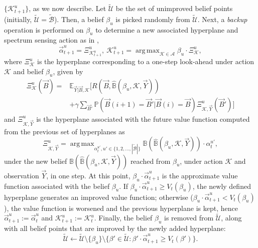 \documentclass[10pt,twocolumn]{IEEEtran}
\DeclareMathOperator*{\argmax}{arg\,max}
\begin{document}
$\{\mathcal K_{t+1}^{u}\}$, as we now describe. Let $\tilde{\mathcal{U}}$ be the set of unimproved belief points (initially, $\tilde{\mathcal{U}}{=}\tilde{\mathcal{B}}$). Then, a belief $\beta_u$ is picked randomly from $\tilde{\mathcal{U}}$. Next, a \emph{backup} operation is performed on $\beta_u$ to determine a new associated hyperplane and spectrum sensing action as in \cite{DBLP:journals/corr/abs-1109-2145},
\begin{equation}\label{20}
    \vec{\alpha}_{t+1}^{u}=\Xi_{\mathcal K_{t+1}^{u}}^{u},\ 
    \mathcal K_{t+1}^{u}=\argmax_{\mathcal{K} \in \mathcal{A}} \beta_u \cdot \Xi_{\mathcal{K}}^{u},
\end{equation}
where $\Xi_{\mathcal{K}}^{u}$ is the hyperplane corresponding to a one-step look-ahead under action $\mathcal K$ and belief $\beta_u$, given by
\begin{align*}
\Xi_{\mathcal{K}}^{u}(\vec{B}) = &\mathbb{E}_{\vec{Y}|\vec{B}, \mathcal{K}} \Big[R(\vec{B}, \hat{\mathbb{B}}(\beta_{u}, \mathcal{K}, \vec{Y}))\\
&+\gamma 
        \sum_{\vec{B}'}\mathbb{P}(\vec{B}(i+1){=} \vec{B}'|\vec{B}(i){=}\vec{B})
                \Xi_{\mathcal{K}, \vec{Y}}^{u}(\vec{B}')\Big]
\nonumber
\end{align*}
and $\Xi_{\mathcal{K}, \vec{Y}}^{u}$ is the hyperplane associated with the future value function computed from the previous set of hyperplanes as
\begin{equation}
    \Xi_{\mathcal{K}, \vec{Y}}^{u}=\argmax_{\alpha_{t}^{u'}, u' {\in} \{1, 2, \dots, |\tilde{\mathcal{B}}|\}} \mathbb{B}(\hat{\mathbb{B}}(\beta_{u}, \mathcal{K}, \vec{Y}))\cdot\alpha_{t}^{u'},
\nonumber
\end{equation}
under the new belief $\mathbb{B}(\hat{\mathbb{B}}(\beta_{u}, \mathcal{K}, \vec{Y}))$ reached from $\beta_{u}$, under action $\mathcal{K}$ and observation $\vec{Y}$, in one step. At this point, $\beta_{u}{\cdot}\vec{\alpha}_{t+1}^{u}$ is the approximate value function associated with the belief $\beta_u$. If $\beta_{u}{\cdot}\vec{\alpha}_{t+1}^{u}{\geq}V_{t}(\beta_{u})$, the newly defined hyperplane generates an improved value function; otherwise ($\beta_{u}{\cdot}\vec{\alpha}_{t+1}^{u}{<}V_{t}(\beta_{u})$), the value function is worsened and the previous hyperplane is kept, hence $\vec{\alpha}_{t+1}^{u}{:=}\vec{\alpha}_{t}^{u}$ and $\mathcal K_{t+1}^{u}{:=}\mathcal K_{t}^{u}$. Finally, the belief $\beta_u$ is removed from $\tilde{\mathcal{U}}$, along with all belief points that are improved by the newly added hyperplane:
$$
\tilde{\mathcal{U}}\leftarrow \tilde{\mathcal{U}}\setminus\{\beta_u\}\setminus
\{\beta'\in\tilde{\mathcal{U}}:\beta'{\cdot}\vec{\alpha}_{t+1}^{u}\geq V_t(\beta')\}.
$$
\end{document}
